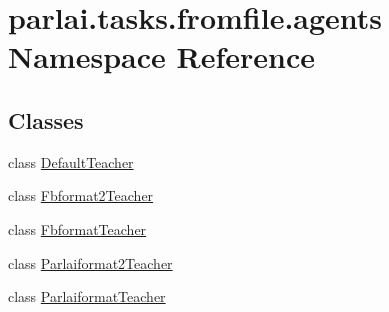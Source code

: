 \hypertarget{namespaceparlai_1_1tasks_1_1fromfile_1_1agents}{}\section{parlai.\+tasks.\+fromfile.\+agents Namespace Reference}
\label{namespaceparlai_1_1tasks_1_1fromfile_1_1agents}
\subsection*{Classes}
\begin{DoxyCompactItemize}
\item 
class \hyperlink{classparlai_1_1tasks_1_1fromfile_1_1agents_1_1DefaultTeacher}{Default\+Teacher}
\item 
class \hyperlink{classparlai_1_1tasks_1_1fromfile_1_1agents_1_1Fbformat2Teacher}{Fbformat2\+Teacher}
\item 
class \hyperlink{classparlai_1_1tasks_1_1fromfile_1_1agents_1_1FbformatTeacher}{Fbformat\+Teacher}
\item 
class \hyperlink{classparlai_1_1tasks_1_1fromfile_1_1agents_1_1Parlaiformat2Teacher}{Parlaiformat2\+Teacher}
\item 
class \hyperlink{classparlai_1_1tasks_1_1fromfile_1_1agents_1_1ParlaiformatTeacher}{Parlaiformat\+Teacher}
\end{DoxyCompactItemize}
